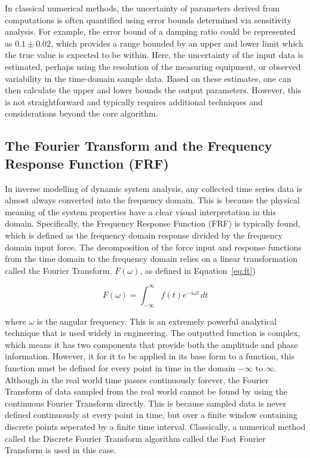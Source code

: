 \documentclass[12pt]{article}
\begin{document}
    In classical numerical methods, the uncertainty of parameters derived from computations is often quantified using error bounds determined via sensitivity analysis.
    For example, the error bound of a damping ratio could be represented as $0.1 \pm 0.02$, which provides a range bounded by an upper and lower limit which the true value is expected to be within.
    Here, the uncertainty of the input data is estimated, perhaps using the resolution of the measuring equipment, or observed variability in the time-domain sample data.
    Based on these estimates, one can then calculate the upper and lower bounds the output parameters.
    However, this is not straightforward and typically requires additional techniques and considerations beyond the core algorithm.


    \subsection{The Fourier Transform and the Frequency Response Function (FRF)}

    In inverse modelling of dynamic system analysis, any collected time series data is almost always converted into the frequency domain.
    This is because the physical meaning of the system properties have a clear visual interpretation in this domain.
    Specifically, the Frequency Response Function (FRF) is typically found, which is defined as the frequency domain response divided by the frequency domain input force.%
    The decomposition of the force input and response functions from the time domain to the frequency domain relies on a linear transformation called the Fourier Transform, $F(\omega)$, as defined in Equation~\ref{eq:ft})

    \begin{equation}
        F(\omega) = \int_{-\infty}^{\infty} f(t) e^{-i \omega t} \, dt\label{eq:ft}
    \end{equation}


    \noindent where $\omega$ is the angular frequency.
    This is an extremely powerful analytical technique that is used widely in engineering.
    The outputted function is complex, which means it has two components that provide both the amplitude and phase information.
    However, it for it to be applied in its base form to a function, this function must be defined for every point in time in the domain $-\infty \text{ to } \infty$.
    Although in the real world time passes continuously forever, the Fourier Transform of data sampled from the real world cannot be found by using the continuous Fourier Transform directly.
    This is because sampled data is never defined continuously at every point in time, but over a finite window containing discrete points seperated by a finite time interval.
    Classically, a numerical method called the Discrete Fourier Transform algorithm called the Fast Fourier Transform is used in this case.
\end{document}
